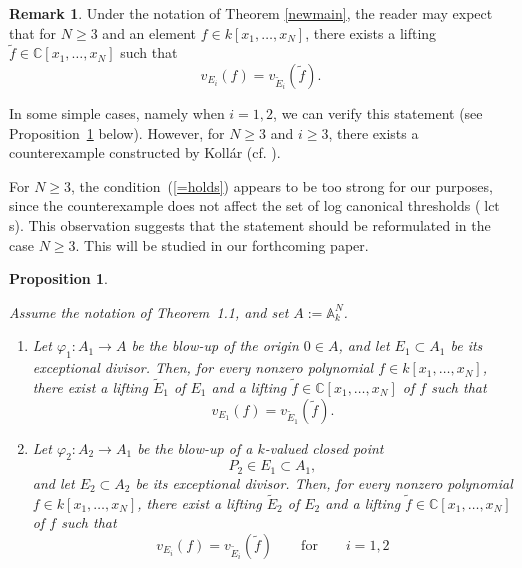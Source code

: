 \documentclass[a4paper]{amsart}
\def\CC{{\mathbb{C}}}
\newcommand{\lct}{{\operatorname{lct}}}
\newcommand{\tf}{{\tilde f}}
\newcommand{\we}{{\widetilde E}}
\newtheorem{prop}[thm]{Proposition}
\theoremstyle{definition}
\newtheorem{rem}[thm]{Remark}
\begin{document}
 
\begin{rem}
Under the notation of Theorem \ref{newmain}, the reader may expect that for $N\geq 3$ and an element $f\in k[x_1,\ldots, x_N]$,
there exists a lifting $\tf\in \CC[x_1,\ldots, x_N]$ such that 
\begin{equation}\label{=holds}
v_{E_i}(f)=v_{\we_i}(\tf).
\end{equation}

In some simple cases, namely when $i = 1,2$, we can verify this statement (see Proposition~\ref{baby} below).
However, for $N \geq 3$ and $i \geq 3$, there exists a counterexample constructed by Koll\'ar (cf. \cite{ko}).

For $N \geq 3$, the condition~(\ref{=holds}) appears to be too strong for our purposes,
since the counterexample does not affect the set of log canonical thresholds ($\lct$s).
This observation suggests that the statement should be reformulated in the case $N \geq 3$.
This will be studied in our forthcoming paper.

\end{rem}

\begin{prop}\label{baby}


Assume the notation of Theorem~1.1, and set $A:=\mathbb{A}_k^N$.

\begin{enumerate}
\item
Let $\varphi_1 \colon A_1 \to A$ be the blow-up of the origin $0 \in A$, and
let $E_1 \subset A_1$ be its exceptional divisor.
Then, for every nonzero polynomial $f\in  k[x_1,\dots,x_N]$,
there exist a lifting $\we_1$ of $E_1$ and a lifting
$\tf\in\CC[x_1,\dots,x_N]$
of $f$ such that
\[
v_{E_1}(f) = v_{\we_1}(\tf).
\]

\item
Let $\varphi_2 \colon A_2 \to A_1$ be the blow-up of a $k$-valued closed point
\[
P_2 \in E_1 \subset A_1,
\]
and let $E_2 \subset A_2$ be its exceptional divisor.
Then, for every nonzero polynomial $f\in  k[x_1,\dots,x_N]$,
there exist a lifting $\we_2$ of $E_2$ and a lifting
$\tf\in\CC[x_1,\dots,x_N]$
of $f$ such that
\[
v_{E_i}(f) = v_{\we_i}(\tf)\qquad \mbox{for}\qquad i=1,2
\]
\end{enumerate}


\end{prop}
\end{document}
